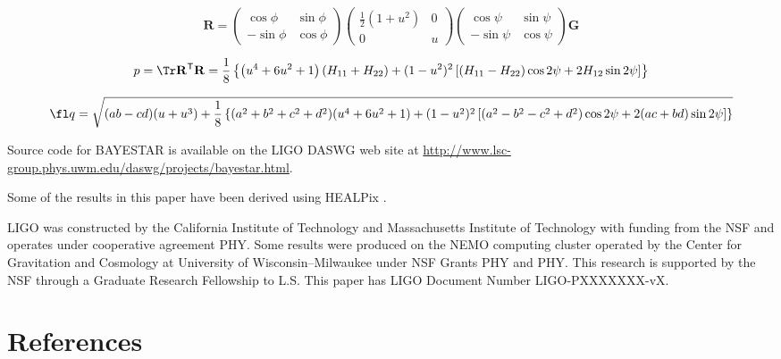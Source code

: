 \documentclass{iopart}
\begin{document}
\begin{equation}
	\mathbf{R} =
	\left(
		\begin{array}{cc}
			\cos \phi & \sin \phi \\
			-\sin \phi & \cos \phi
		\end{array}
	\right)
	\left(
		\begin{array}{cc}
			\frac{1}{2} (1 + u^2) & 0 \\
			0 & u
		\end{array}
	\right)
	\left(
		\begin{array}{cc}
			\cos \psi & \sin \psi \\
			-\sin \psi & \cos \psi
		\end{array}
	\right) \mathbf{G}
\end{equation}

\begin{equation}
	p = \Tr \mathbf{R}^\mathsf{T} \mathbf{R}
	= \frac{1}{8} \left\{
		\left(u^4 + 6 u^2 + 1\right) \left(H_{11} + H_{22}\right) + (1 - u^2)^2
		\left[ \left( H_{11} - H_{22} \right) \cos 2\psi + 2 H_{12} \sin 2\psi \right]
	\right\}
\end{equation}

\begin{equation}\fl
	q = \sqrt{(ab - cd) (u + u^3) + \frac{1}{8} \left\{ (a^2 + b^2 + c^2 + d^2)(u^4 + 6u^2 + 1) + (1 - u^2)^2 \left[ (a^2 - b^2 - c^2 + d^2) \cos 2\psi + 2(ac + bd) \sin 2\psi \right] \right\}}
\end{equation}

\ack Source code for \ac{BAYESTAR} is available on the \acs{LIGO} \acl{DASWG} web site at \url{http://www.lsc-group.phys.uwm.edu/daswg/projects/bayestar.html}.

Some of the results in this paper have been derived using HEALPix \cite{healpix}.

\acs{LIGO} was constructed by the California Institute of Technology and Massachusetts Institute of Technology with funding from the \ac{NSF} and operates under cooperative agreement PHY.  Some results were produced on the NEMO computing cluster operated by the Center for Gravitation and Cosmology at University of Wisconsin\nobreakdashes--Milwaukee under \ac{NSF} Grants PHY and PHY.  This research is supported by the \ac{NSF} through a Graduate Research Fellowship to L.S.  This paper has \acs{LIGO} Document Number \acs{LIGO}\nobreakdashes-PXXXXXXX\nobreakdashes-vX.


\section*{References}


\end{document}
